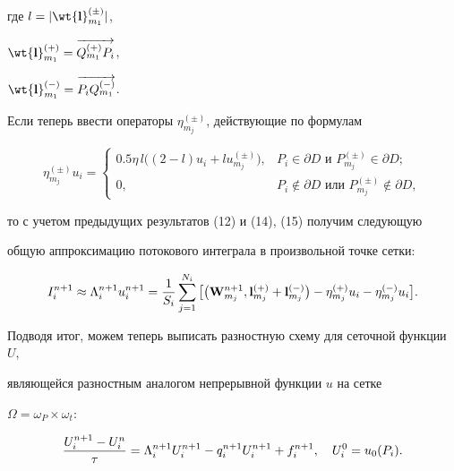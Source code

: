 где $l = | \wt{\bold l}_{m_1}^{(\pm)} |$, 


$\wt{\bold l}_{m_1}^{(+)} = \overrightarrow{Q_{m_1}^{(+)} P_i}$,


$\wt{\bold l}_{m_1}^{(-)} = \overrightarrow{P_i Q_{m_1}^{(-)}}$.


Если теперь ввести операторы $\eta_{m_j}^{(\pm)}$, действующие по формулам


$$


\eta_{m_j}^{(\pm)} u_i =


\begin{cases}


0.5\eta\,l\big((2-l) u_i + l u_{m_j}^{(\pm)}\big), &


P_i \in \partial D \text { и } P_{m_j}^{(\pm)} \in \partial D;\\


0, & P_i \notin \partial D \text{ или } P_{m_j}^{(\pm)} \notin \partial D,


\end{cases}


$$


то с учетом предыдущих результатов (12) и (14), (15) получим следующую


общую аппроксимацию потокового интеграла в произвольной точке сетки:


$$


I_i^{n+1} \approx \Lambda_i^{n+1} u_i^{n+1} =


\frac{1}{S_i}\sum_{j=1}^{N_i}\big[


\bigl({\bold W}_{m_j}^{n+1},{\bold l}_{m_j}^{(+)}+{\bold l}_{m_j}^{(-)}\bigr)


-\eta_{m_j}^{(+)} u_i -\eta_{m_j}^{(-)} u_i \big].


$$





Подводя итог, можем теперь выписать разностную схему для сеточной функции $U$,


являющейся разностным аналогом непрерывной функции $u$ на сетке 


$\Omega=\omega_P\times\omega_t$:


\begin{equation}


\lEq{18}


\frac{U_i^{n+1}-U_i^n}{\tau} = \Lambda_i^{n+1} U_i^{n+1} - 


q_i^{n+1} U_i^{n+1} + f_i^{n+1}, \quad U_i^0 = u_0(P_i). 


\end{equation}


